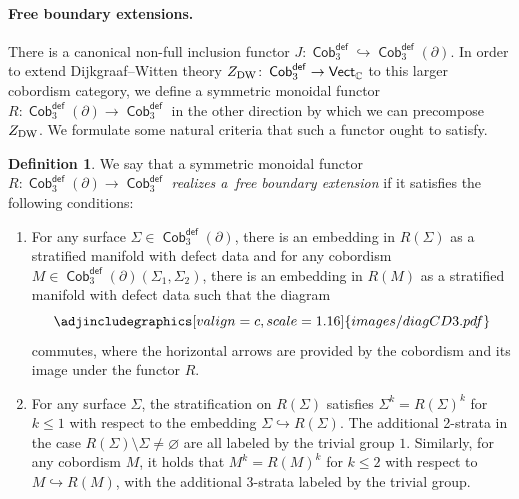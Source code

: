 \documentclass[pdftex]{sigma}
\DeclareMathOperator{\vect}{\mathsf{Vect}}
\DeclareMathOperator{\C}{\mathbb{C}}
\DeclareMathOperator{\Cob}{\mathsf{Cob}}
\numberwithin{equation}{section}
\theoremstyle{definition}
\newtheorem{Definition}[Definition]{Definition}
\begin{document}
\paragraph{Free boundary extensions.} There is a canonical non-full inclusion functor $J\colon \Cob_3^{\mathsf{def}} \hookrightarrow \Cob_3^{\mathsf{def}}(\partial)$. In order to extend Dijkgraaf--Witten theory $Z_{\rm DW}\colon \Cob_3^{\mathsf{def}} \rightarrow \vect_{\C}$ to this larger cobordism category, we define a symmetric monoidal functor
$R\colon \Cob_3^{\mathsf{def}}(\partial) \rightarrow \Cob_3^{\mathsf{def}}$
in the other direction by which we can precompose $Z_{\rm DW}$. We formulate some natural criteria that such a functor ought to satisfy.
\begin{Definition}\label{defFBE}
 We say that a symmetric monoidal functor $R\colon \Cob_3^{\mathsf{def}}(\partial) \rightarrow \Cob_3^{\mathsf{def}}$ \textit{realizes a~free boundary extension} if it satisfies the following conditions:
 \begin{enumerate}[(F1)]\itemsep=0pt
 \item \label{F1} For any surface $\Sigma \in \Cob_3^{\mathsf{def}}(\partial)$, there is an embedding in $R(\Sigma)$ as a stratified manifold with defect data and for any cobordism $M \in \Cob_3^{\mathsf{def}}(\partial)(\Sigma_1, \Sigma_2)$, there is an embedding in $R(M)$ as a stratified manifold with defect data such that the diagram
 \[
 \centering
 \adjincludegraphics[valign=c, scale = 1.16]{images/diagCD3.pdf}
 \]
 commutes, where the horizontal arrows are provided by the cobordism and its image under the functor $R$.
 \item \label{F2} For any surface $\Sigma$, the stratification on $R(\Sigma)$ satisfies $\Sigma^k = R(\Sigma)^k$ for $k \leq 1$
 with respect to the embedding $\Sigma \hookrightarrow R(\Sigma)$. The additional 2-strata in the case $R(\Sigma)\setminus\Sigma \neq \varnothing$ are all labeled by the trivial group $1$. Similarly, for any cobordism $M$, it holds that $M^k = R(M)^k$ for $k \leq 2$ with respect to $M \hookrightarrow R(M)$, with the additional 3-strata labeled by the trivial group.
 \end{enumerate}
\end{Definition}
\end{document}
